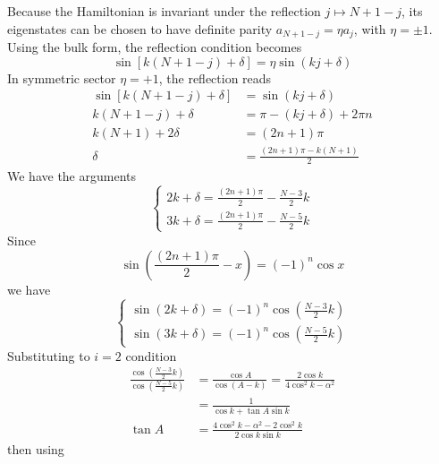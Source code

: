 \documentclass[../../../main.tex]{subfiles}
\begin{document}
Because the Hamiltonian is invariant under the reflection \(j\mapsto N+1-j\), its eigenstates can be chosen to have definite parity $a_{N+1-j}=\eta a_j$, with $\eta=\pm1$.
Using the bulk form, the reflection condition becomes
\begin{equation*}
  \sin\left[k(N+1-j)+\delta\right]=\eta\sin(kj+\delta)
\end{equation*}
In symmetric sector $\eta=+1$, the reflection reads
\begin{align*}
  \sin\left[k(N+1-j)+\delta\right] & = \sin(kj+\delta)            \\
  k(N+1-j)+\delta                  & = \pi-(kj+\delta)+2\pi n     \\
  k(N+1)+2\delta                   & = (2n+1)\pi                  \\
  \delta                           & = \frac{(2n+1)\pi-k(N+1)}{2}
\end{align*}
We have the arguments
\begin{equation*}
  \begin{cases}
    2k+\delta = \frac{(2n+1)\pi}{2} -\frac{N-3}{2}k
    \\
    3k+\delta = \frac{(2n+1)\pi}{2} -\frac{N-5}{2}k
  \end{cases}
\end{equation*}
Since
\begin{equation*}
  \sin\left(\frac{(2n+1)\pi}{2}-x\right) = (-1)^n\cos x
\end{equation*}
we have
\begin{equation*}
  \begin{cases}
    \sin(2k+\delta) = (-1)^n \cos\left(\frac{N-3}{2}k\right) \\
    \sin(3k+\delta) = (-1)^n \cos\left(\frac{N-5}{2}k\right)
  \end{cases}
\end{equation*}
Substituting to $i=2$ condition
\begin{align*}
  \frac{ \cos\left(\frac{N-3}{2}k\right)} { \cos\left(\frac{N-5}{2}k\right) }
         & = \frac{\cos A}{\cos(A-k)}
  =  \frac{2\cos k}{4\cos^2k-\alpha^2}                         \\
         & = \frac{1}{\cos k+\tan A\sin k}                     \\
  \tan A & =  \frac{4\cos^2k-\alpha^2-2\cos^2k}{2\cos k\sin k}
\end{align*}
then using
\end{document}
